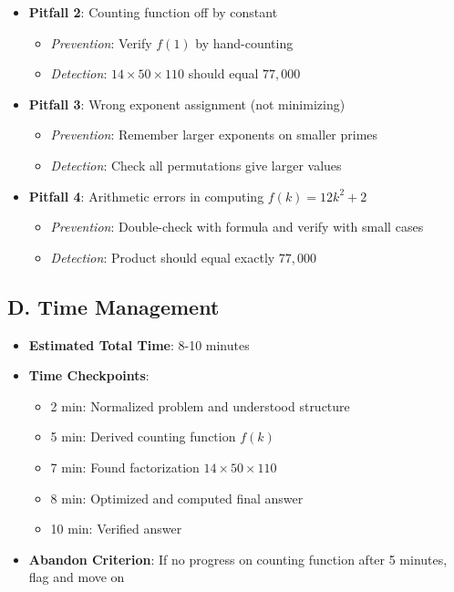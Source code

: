 \documentclass[11pt]{article}
\begin{document}
\begin{roadmapbox}
\begin{itemize}[leftmargin=*]
    \item \textbf{Pitfall 2}: Counting function off by constant
    \begin{itemize}
        \item \textit{Prevention}: Verify $f(1)$ by hand-counting
        \item \textit{Detection}: $14 \times 50 \times 110$ should equal $77,000$
    \end{itemize}
    
    \item \textbf{Pitfall 3}: Wrong exponent assignment (not minimizing)
    \begin{itemize}
        \item \textit{Prevention}: Remember larger exponents on smaller primes
        \item \textit{Detection}: Check all permutations give larger values
    \end{itemize}
    
    \item \textbf{Pitfall 4}: Arithmetic errors in computing $f(k) = 12k^2 + 2$
    \begin{itemize}
        \item \textit{Prevention}: Double-check with formula and verify with small cases
        \item \textit{Detection}: Product should equal exactly $77,000$
    \end{itemize}
\end{itemize}

\subsection*{D. Time Management}
\begin{itemize}[leftmargin=*]
    \item \textbf{Estimated Total Time}: 8-10 minutes
    \item \textbf{Time Checkpoints}:
    \begin{itemize}
        \item 2 min: Normalized problem and understood structure
        \item 5 min: Derived counting function $f(k)$
        \item 7 min: Found factorization $14 \times 50 \times 110$
        \item 8 min: Optimized and computed final answer
        \item 10 min: Verified answer
    \end{itemize}
    \item \textbf{Abandon Criterion}: If no progress on counting function after 5 minutes, flag and move on
\end{itemize}
\end{roadmapbox}
\end{document}

